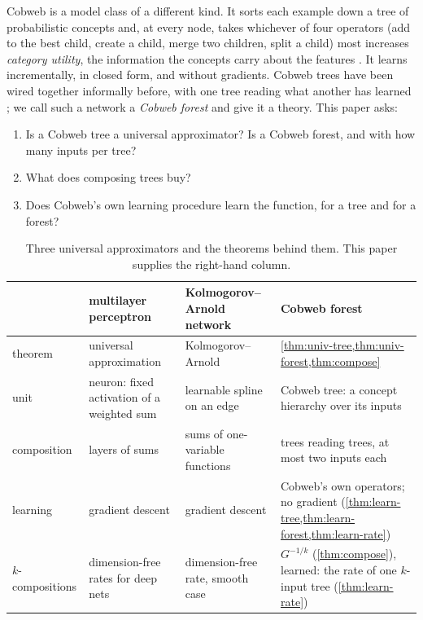 Cobweb \citep{fisher1987} is a model class of a different kind.  It sorts each example
down a tree of probabilistic concepts and, at every node, takes whichever of four
operators (add to the best child, create a child, merge two children, split a child) most
increases \emph{category utility}, the information the concepts carry about the features
\citep{corter1992,maclellan2026rational}.  It learns incrementally, in closed form, and
without gradients.  Cobweb trees have been wired together informally before, with one
tree reading what another has learned \citep{maclellan2021conv,singaravadivelan2026trellis};
we call such a network a \emph{Cobweb forest} and give it a theory.  This paper asks:
\begin{enumerate}[label=\textbf{Q\arabic*.},leftmargin=*,noitemsep]
\item Is a Cobweb tree a universal approximator?  Is a Cobweb forest, and with how many
  inputs per tree?
\item What does composing trees buy?
\item Does Cobweb's own learning procedure learn the function, for a tree and for a forest?
\end{enumerate}

\begin{table}[t]
\centering\small
\begin{tabular}{@{}p{2.6cm}p{4.0cm}p{4.0cm}p{4.4cm}@{}}\toprule
 & multilayer perceptron & Kolmogorov--Arnold network & Cobweb forest\\\midrule
theorem & universal approximation \citep{cybenko1989,hornik1989} & Kolmogorov--Arnold \citep{kolmogorov1957} & \cref{thm:univ-tree,thm:univ-forest,thm:compose}\\
unit & neuron: fixed activation of a weighted sum & learnable spline on an edge & Cobweb tree: a concept hierarchy over its inputs\\
composition & layers of sums & sums of one-variable functions & trees reading trees, at most two inputs each\\
learning & gradient descent & gradient descent & Cobweb's own operators; no gradient (\cref{thm:learn-tree,thm:learn-forest,thm:learn-rate})\\
$k$-compositions & dimension-free rates for deep nets \citep{poggio2017} & dimension-free rate, smooth case \citep{liu2024kan} & $G^{-1/k}$ (\cref{thm:compose}), learned: the rate of one $k$-input tree (\cref{thm:learn-rate})\\
\bottomrule
\end{tabular}
\caption{Three universal approximators and the theorems behind them.  This paper supplies
the right-hand column.}
\label{tab:three}
\end{table}

